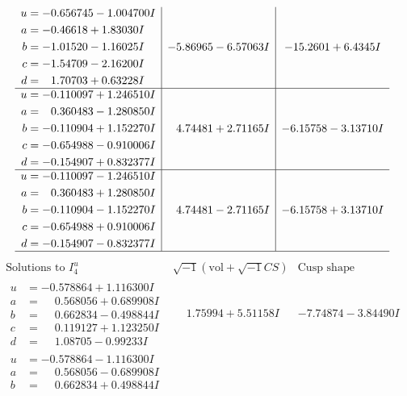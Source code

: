 \documentclass[1p]{elsarticle_modified}
\theoremstyle{definition}
\newcommand{\I}{\sqrt{-1}}
\begin{document}
$$\begin{array}{c|c|c}
\begin{aligned}
u &= -0.656745 - 1.004700 I \\
a &= -0.46618 + 1.83030 I \\
b &= -1.01520 - 1.16025 I \\
c &= -1.54709 - 2.16200 I \\
d &= \phantom{-}1.70703 + 0.63228 I\end{aligned}
 & -5.86965 - 6.57063 I & -15.2601 + 6.4345 I \\ \hline\begin{aligned}
u &= -0.110097 + 1.246510 I \\
a &= \phantom{-}0.360483 - 1.280850 I \\
b &= -0.110904 + 1.152270 I \\
c &= -0.654988 - 0.910006 I \\
d &= -0.154907 + 0.832377 I\end{aligned}
 & \phantom{-}4.74481 + 2.71165 I & -6.15758 - 3.13710 I \\ \hline\begin{aligned}
u &= -0.110097 - 1.246510 I \\
a &= \phantom{-}0.360483 + 1.280850 I \\
b &= -0.110904 - 1.152270 I \\
c &= -0.654988 + 0.910006 I \\
d &= -0.154907 - 0.832377 I\end{aligned}
 & \phantom{-}4.74481 - 2.71165 I & -6.15758 + 3.13710 I\\
 \hline 
 \end{array}$$\newpage$$\begin{array}{c|c|c}  
\text{Solutions to }I^u_{4}& \I (\text{vol} + \sqrt{-1}CS) & \text{Cusp shape}\\
 \hline 
\begin{aligned}
u &= -0.578864 + 1.116300 I \\
a &= \phantom{-}0.568056 + 0.689908 I \\
b &= \phantom{-}0.662834 - 0.498844 I \\
c &= \phantom{-}0.119127 + 1.123250 I \\
d &= \phantom{-}1.08705 - 0.99233 I\end{aligned}
 & \phantom{-}1.75994 + 5.51158 I & -7.74874 - 3.84490 I \\ \hline\begin{aligned}
u &= -0.578864 - 1.116300 I \\
a &= \phantom{-}0.568056 - 0.689908 I \\
b &= \phantom{-}0.662834 + 0.498844 I \\

\end{aligned}
\end{array}$$
\end{document}
